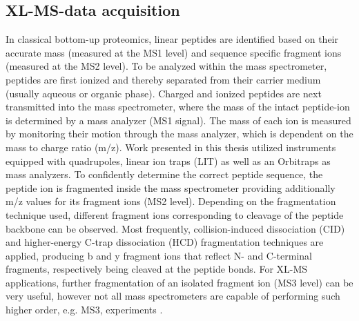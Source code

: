 \subsection*{XL-MS-data acquisition}
In classical bottom-up proteomics, linear peptides are identified based on their accurate mass (measured at the MS1 level) and sequence specific fragment ions (measured at the MS2 level). To be analyzed within the mass spectrometer, peptides are first ionized and thereby separated from their carrier medium (usually aqueous or organic phase). Charged and ionized peptides are next transmitted into the mass spectrometer, where the mass of the intact peptide-ion is determined by a mass analyzer (MS1 signal). The mass of each ion is measured by monitoring their motion through the mass analyzer, which is dependent on the mass to charge ratio (m/z). Work presented in this thesis utilized instruments equipped with quadrupoles, linear ion traps (LIT) as well as an Orbitraps as mass analyzers. To confidently determine the correct peptide sequence, the peptide ion is fragmented inside the mass spectrometer providing additionally m/z values for its fragment ions (MS2 level). Depending on the fragmentation technique used, different fragment ions corresponding to cleavage of the peptide backbone can be observed. Most frequently, collision-induced dissociation (CID) \cite{Hunt_1986} and higher-energy C-trap dissociation (HCD) \cite{Olsen_2007} fragmentation techniques are applied, producing b and y fragment ions that reflect N- and C-terminal fragments, respectively being cleaved at the peptide bonds. For XL-MS applications, further fragmentation of an isolated fragment ion (MS3 level) can be very useful, however not all mass spectrometers are capable of performing such higher order, e.g. MS3, experiments \cite{Liu_2017a, Lossl_2016}.\\
